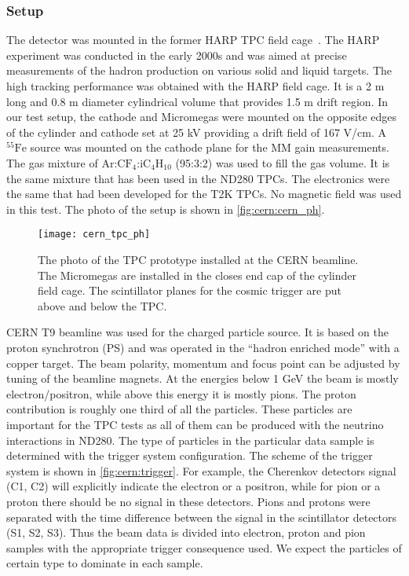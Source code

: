 \documentclass[../main.tex]{subfiles}
\begin{document}
\subsubsection{Setup}
The detector was mounted in the former HARP TPC field cage~\cite{Prior2003}. The HARP experiment was conducted in the early 2000s and was aimed at precise measurements of the hadron production on various solid and liquid targets. The high tracking performance was obtained with the HARP field cage. It is a 2 m long and 0.8 m diameter cylindrical volume that provides 1.5 m drift region. In our test setup, the cathode and Micromegas were mounted on the opposite edges of the cylinder and cathode set at 25 kV providing a drift field of 167 V/cm. A ${}^{55}\text{Fe}$ source was mounted on the cathode plane for the MM gain measurements. The gas mixture of $\text{Ar:CF}_4\text{:iC}_4\text{H}_{10}$ (95:3:2) was used to fill the gas volume. It is the same mixture that has been used in the ND280 TPCs. The electronics were the same that had been developed for the T2K TPCs. No magnetic field was used in this test. The photo of the setup is shown in \autoref{fig:cern:cern_ph}.

\begin{figure}[!ht]
  \centering
  \texttt{[image: cern\_tpc\_ph]}
  \caption{The photo of the TPC prototype installed at the CERN beamline. The Micromegas are installed in the closes end cap of the cylinder field cage. The scintillator planes for the cosmic trigger are put above and below the TPC.}
  \label{fig:cern:cern_ph}
\end{figure}

CERN T9 beamline was used for the charged particle source. It is based on the proton synchrotron (PS) and was operated in the ``hadron enriched mode'' with a copper target. The beam polarity, momentum and focus point can be adjusted by tuning of the beamline magnets.
At the energies below 1 GeV the beam is mostly electron/positron, while above this energy it is mostly pions. The proton contribution is roughly one third of all the particles. These particles are important for the TPC tests as all of them can be produced with the neutrino interactions in ND280. The type of particles in the particular data sample is determined with the trigger system configuration. The scheme of the trigger system is shown in \autoref{fig:cern:trigger}.  For example, the Cherenkov detectors signal (C1, C2)  will explicitly indicate the electron or a positron, while for pion or a proton there should be no signal in these detectors. Pions and protons were separated with the time difference between the signal in the scintillator detectors (S1, S2, S3). Thus the beam data is divided into electron, proton and pion samples with the appropriate trigger consequence used. We expect the particles of certain type to dominate in each sample.
\end{document}
